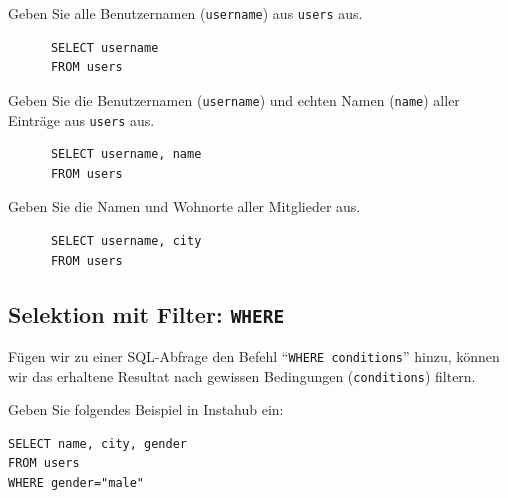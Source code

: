 \begin{myexercise}
  Geben Sie alle Benutzernamen (\texttt{username}) aus \texttt{users} aus.
  \begin{myanswer}
    \begin{lstlisting}
      SELECT username
      FROM users
      \end{lstlisting}
  \end{myanswer}
\end{myexercise}

\begin{myexercise}
  Geben Sie die Benutzernamen (\texttt{username}) und echten Namen (\texttt{name}) aller Einträge aus \texttt{users} aus.
  \begin{myanswer}
    \begin{lstlisting}
      SELECT username, name
      FROM users
    \end{lstlisting}
  \end{myanswer}
\end{myexercise}

\begin{myexercise}
  Geben Sie die Namen und Wohnorte aller Mitglieder aus.
  \begin{myanswer}
    \begin{lstlisting}
      SELECT username, city
      FROM users
    \end{lstlisting}
  \end{myanswer}
\end{myexercise}

\subsection{Selektion mit Filter: \texorpdfstring{\lstinline|WHERE|}{WHERE}}
Fügen wir zu einer \gls{SQL}-Abfrage den Befehl ``\lstinline|WHERE conditions|'' hinzu, können wir das erhaltene Resultat nach gewissen Bedingungen (\texttt{conditions}) filtern.

\begin{myexample}
Geben Sie folgendes Beispiel in Instahub ein:

\begin{lstlisting}
SELECT name, city, gender
FROM users
WHERE gender="male"
\end{lstlisting}
\end{myexample}

